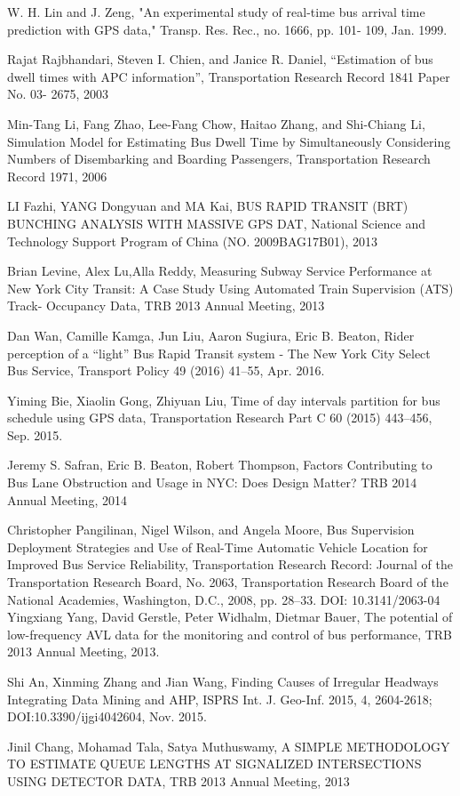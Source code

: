 \documentclass[12pt]{report}
\begin{document}
\begin{thebibliography}{9}

W. H. Lin and J. Zeng, "An experimental study of real-time bus arrival time prediction with GPS data," Transp. Res. Rec., no. 1666, pp. 101- 109, Jan. 1999.

Rajat Rajbhandari, Steven I. Chien, and Janice R. Daniel, “Estimation of bus dwell times with APC information”, Transportation Research Record 1841 Paper No. 03- 2675, 2003

Min-Tang Li, Fang Zhao, Lee-Fang Chow, Haitao Zhang, and Shi-Chiang Li, Simulation Model for Estimating Bus Dwell Time by Simultaneously Considering Numbers of Disembarking and
Boarding Passengers, Transportation Research Record 1971, 2006

LI Fazhi, YANG Dongyuan and MA Kai, BUS RAPID TRANSIT (BRT) BUNCHING ANALYSIS WITH MASSIVE GPS DAT, National Science and Technology Support Program of China (NO. 2009BAG17B01), 2013

Brian Levine, Alex Lu,Alla Reddy, Measuring Subway Service Performance at New York City Transit: A Case Study Using Automated Train Supervision (ATS) Track- Occupancy Data, TRB 2013 Annual Meeting, 2013

Dan Wan, Camille Kamga, Jun Liu, Aaron Sugiura, Eric B. Beaton, Rider perception of a “light” Bus Rapid Transit system - The New York City Select Bus Service, Transport Policy 49 (2016) 41–55, Apr. 2016.

Yiming Bie, Xiaolin Gong, Zhiyuan Liu, Time of day intervals partition for bus schedule using GPS data, Transportation Research Part C 60 (2015) 443–456, Sep. 2015.

Jeremy S. Safran, Eric B. Beaton, Robert Thompson, Factors Contributing to Bus Lane Obstruction and Usage in NYC: Does Design Matter? TRB 2014 Annual Meeting, 2014
 
Christopher Pangilinan, Nigel Wilson, and Angela Moore, Bus Supervision Deployment Strategies and Use of Real-Time Automatic
Vehicle Location for Improved
Bus Service Reliability, Transportation Research Record: Journal of the Transportation Research Board, No. 2063, Transportation Research Board of the National Academies, Washington, D.C., 2008, pp. 28–33.
DOI: 10.3141/2063-04
Yingxiang Yang, David Gerstle, Peter Widhalm, Dietmar Bauer, The potential of low-frequency AVL data for the monitoring and control of bus performance, TRB 2013 Annual Meeting, 2013.

Shi An, Xinming Zhang and Jian Wang, Finding Causes of Irregular Headways Integrating Data Mining and AHP, ISPRS Int. J. Geo-Inf. 2015, 4, 2604-2618; DOI:10.3390/ijgi4042604, Nov. 2015.

Jinil Chang, Mohamad Tala, Satya Muthuswamy, A SIMPLE METHODOLOGY TO ESTIMATE QUEUE LENGTHS AT SIGNALIZED INTERSECTIONS USING DETECTOR DATA, TRB 2013 Annual Meeting, 2013




\end{thebibliography}
\end{document}
